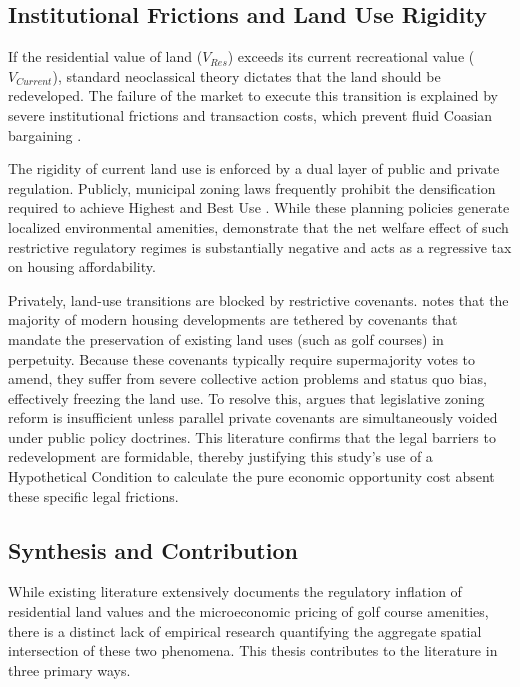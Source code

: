 \documentclass[10pt, letterpaper]{article}
\begin{document}
\subsection{Institutional Frictions and Land Use Rigidity}
If the residential value of land ($V_{Res}$) exceeds its current recreational value ($V_{Current}$), standard neoclassical theory dictates that the land should be redeveloped. The failure of the market to execute this transition is explained by severe institutional frictions and transaction costs, which prevent fluid Coasian bargaining \parencite{Coase1960}. 

The rigidity of current land use is enforced by a dual layer of public and private regulation. Publicly, municipal zoning laws frequently prohibit the densification required to achieve Highest and Best Use \parencite{Fischel2015}. While these planning policies generate localized environmental amenities, \textcite{Cheshire2002} demonstrate that the net welfare effect of such restrictive regulatory regimes is substantially negative and acts as a regressive tax on housing affordability. 

Privately, land-use transitions are blocked by restrictive covenants. \textcite{Ellickson2022} notes that the majority of modern housing developments are tethered by covenants that mandate the preservation of existing land uses (such as golf courses) in perpetuity. Because these covenants typically require supermajority votes to amend, they suffer from severe collective action problems and status quo bias, effectively freezing the land use. To resolve this, \textcite{Korngold2024} argues that legislative zoning reform is insufficient unless parallel private covenants are simultaneously voided under public policy doctrines. This literature confirms that the legal barriers to redevelopment are formidable, thereby justifying this study's use of a Hypothetical Condition to calculate the pure economic opportunity cost absent these specific legal frictions.

\subsection{Synthesis and Contribution}
While existing literature extensively documents the regulatory inflation of residential land values and the microeconomic pricing of golf course amenities, there is a distinct lack of empirical research quantifying the aggregate spatial intersection of these two phenomena. This thesis contributes to the literature in three primary ways. 
\end{document}
